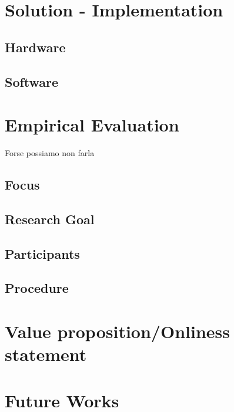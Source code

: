 \documentclass{article}
\begin{document}
\section{Solution - Implementation}
    \subsection{Hardware}
    
    \subsection{Software}
\newpage   

\section{Empirical Evaluation}Forse possiamo non farla
    \subsection{Focus}
    \subsection{Research Goal}
    \subsection{Participants}
    \subsection{Procedure}
\newpage   

\section{Value proposition/Onliness statement}
\newpage   

\section{Future Works}
\newpage   
\end{document}

